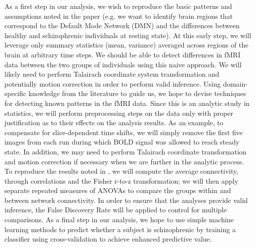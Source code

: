\documentclass[11pt]{article}
\begin{document}
As a first step in our analysis, we wish to reproduce the basic patterns and
assumptions noted in the paper (e.g. we want to identify brain regions that
correspond to the Default Mode Network (DMN) and the differences between
healthy and schizophrenic individuals at resting state). At this early step,
we will leverage only summary statistics (mean, variance) averaged across 
regions of the brain at arbitrary time steps. We should be able to detect 
differences in fMRI data between the two groups of individuals using this 
naive approach. We will likely need to perform Talairach coordinate system 
transformation and potentially motion correction in order to perform valid 
inference. Using domain-specific knowledge from the literature to guide us, 
we hope to devise techniques for detecting known patterns in the fMRI data. 
Since this is an analytic study in statistics, we will perform preprocessing
steps on the data only with proper justification as to their effects on the 
analysis results. As an example, to compensate for slice-dependent time shifts,
we will simply remove the first five images from each run during which BOLD 
signal was allowed to reach steady state. In addition, we may need to perform
Talairach coordinate transformation and motion correction if necessary when 
we are further in the analytic process. To reproduce the results noted in 
\cite{repovs2011}, we will compute the average connectivity, through 
correlations and the Fisher r-to-z transformation; we will then apply separate
repeated measures of ANOVAs to compare the groups within and between network
connectivity. In order to ensure that the analyses provide valid inference, 
the False Discovery Rate will be applied to control for multiple comparisons. 
As a final step in our analysis, we hope to use simple machine learning methods
to predict whether a subject is schizophrenic by training a classifier using
cross-validation to achieve enhanced predictive value.



\end{document}
